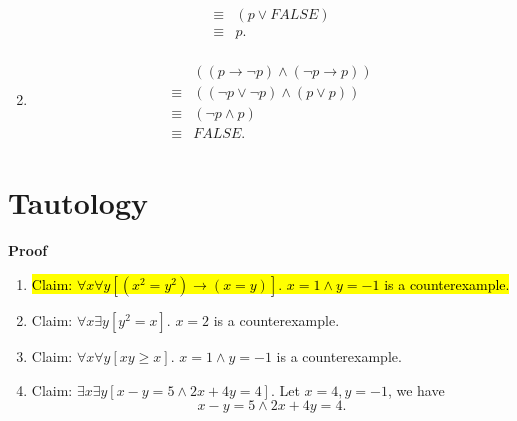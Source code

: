\documentclass{../../cls/sig-alternate-05-2015}
\begin{document}
\begin{enumerate}[label=(\alph*)]
\begin{align}
\begin{aligned}
        \equiv & (p \lor FALSE)\\
        \equiv & p.
        \end{aligned}
    \end{align}
    \item \begin{align}
        \begin{aligned}
        & ((p \rightarrow \lnot p) \land (\lnot p \rightarrow p))\\
        \equiv & ((\lnot p \lor \lnot p) \land (p \lor p))\\ \equiv & (\lnot p \land p)\\
        \equiv & FALSE.
        \end{aligned}
    \end{align}
\end{enumerate}

\section{Tautology}
\textbf{Proof}\begin{enumerate}[label=(\alph*)]
	\item \hl{Claim: $\forall x \forall y [(x^2 = y^2) \rightarrow (x = y)]$. $x = 1 \land y = -1$ is a counterexample.}
	\item Claim: $\forall x \exists y [y^2 = x]$. $x = 2$ is a counterexample.
	\item Claim: $\forall x \forall y [xy \ge x]$. $x = 1 \land y = -1$ is a counterexample.
	\item Claim: $\exists x \exists y [x - y = 5 \land 2x + 4y = 4]$. Let $x = 4, y = -1$, we have \begin{equation}
		x - y = 5 \land 2x + 4y = 4.
	\end{equation}
\end{enumerate}
\end{document}
